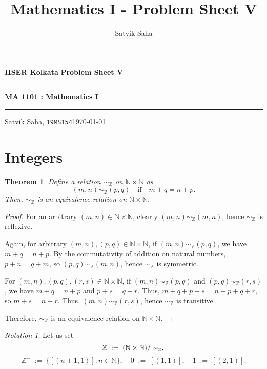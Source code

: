 \documentclass[10pt]{article}
\title{Mathematics I - Problem Sheet V}
\author{Satvik Saha}
\date{}
\newtheorem{theorem}{Theorem}[section]
\theoremstyle{definition}
\theoremstyle{remark}
\newtheorem*{notation}{Notation}
\newcommand{\N}{\mathbb{N}}
\newcommand{\Z}{\mathbb{Z}}
\newcommand{\simZ}{\sim_{\Z}}
\begin{document}
        \par\textbf{IISER Kolkata} \hfill \textbf{Problem Sheet V}
        \vspace{3pt}
        \hrule
        \vspace{3pt}
        \begin{center}
                \LARGE{\textbf{MA 1101 : Mathematics I}}
        \end{center}
        \vspace{3pt}
        \hrule
        \vspace{3pt}
        Satvik Saha, \texttt{19MS154}\hfill\today
        \vspace{20pt}

        \section{Integers}
        \begin{theorem}
        Define a relation $\simZ$ on $\N\times \N$ as
        \[(m, n) \simZ (p, q) \quad\text{if}\quad m + q = n + p. \]
        Then, $\simZ$ is an equivalence relation on $\N\times \N$.
        \end{theorem}
        \begin{proof}
                For an arbitrary $(m, n) \in \N\times \N$, clearly $(m, n) \simZ (m, n)$, hence $\simZ $ is reflexive.

                Again, for arbitrary $(m, n), (p, q) \in \N\times \N$, if
                $(m, n) \simZ (p, q)$, we have $m + q = n + p$.
                By the commutativity of addition on natural numbers, $p + n = q + m$, so 
                $(p, q) \simZ (m, n) $, hence $\simZ$ is symmetric.

                For $(m, n), (p, q), (r, s) \in \N\times \N$, if
                $(m, n) \simZ (p, q)$ and $(p, q) \simZ (r, s)$, we have
                $m + q = n + p$ and $p + s = q + r$. Thus, 
                $m + q + p + s = n + p + q + r$, so $m + s = n + r$.
                Thus, $(m, n) \simZ (r, s)$, hence $\simZ$ is transitive.

                Therefore, $\simZ$ is an equivalence relation on $\N\times \N$.
        \end{proof}

        \begin{notation}
        Let us set
        \[
                \Z \;:=\; (\N \times \N)/\simZ,\\
        \]
        \[
                \Z^+ \;:=\; \{[(n + 1, 1)] : n \in \N\}, \quad
                \bar{0} \;:=\; [(1, 1)], \quad
                \bar{1} \;:=\; [(2, 1)].
        \]
        \end{notation}
\end{document}
